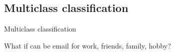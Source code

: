 
\subsection{Multiclass classification}

Multiclass classification

What if can be email for work, friends, family, hobby?

